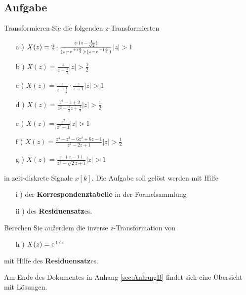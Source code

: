 \documentclass[11pt,a4paper,DIV=12]{scrartcl}
\begin{document}
\subsection{Aufgabe}
Transformieren Sie die folgenden z-Transformierten
\begin{itemize}
	\item[a )] $X(z)=2\cdot\frac{z\cdot(z-\frac{1}{\sqrt{2}})}{(z-\e^{+\im\frac{\pi}{4}})\cdot(z-\e^{-\im\frac{\pi}{4}})}$\quad {}$|z|>1$
	\item[b )] $X(z)=\frac{z}{z-\frac{1}{2}}$\quad {}$|z|>\frac{1}{2}$
	\item[c )] $X(z)=\frac{z}{z-\frac{1}{2}}\cdot\frac{z}{z-1}$\quad {}$|z|>1$
	\item[d )] $X(z)=\frac{z^2-z+2}{z^2-\frac{1}{2}z+\frac{1}{4}}$\quad {}$|z|>\frac{1}{2}$
	\item[e )] $X(z)=\frac{z^2}{z^2+1}$\quad {}$|z|>1$
	\item[f )] $X(z)=\frac{z^4+z^3-6z^2+6z-1}{z^2-2z+1}$\quad {}$|z|>\frac{1}{2}$
	\item[g )] $X(z)=\frac{z\cdot(z-1)}{z^2-\sqrt{2}z+1}$\quad {}$|z|>1$
\end{itemize}
in zeit-diskrete Signale $x[k]$. %
Die Aufgabe soll gelöst werden mit Hilfe
\begin{itemize}
	\item[i )] der \textbf{Korrespondenztabelle} in der Formelsammlung
	\item[ii )] des \textbf{Residuensatz}es.
\end{itemize}
Berechen Sie außerdem die inverse z-Transformation von
\begin{itemize}
	\item[h )] $X(z)=\e^{1/z}$
\end{itemize}
mit Hilfe des \textbf{Residuensatz}es.

Am Ende des Dokumentes in Anhang \ref{sec:AnhangB} findet sich eine Übersicht mit Lösungen.
\end{document}
